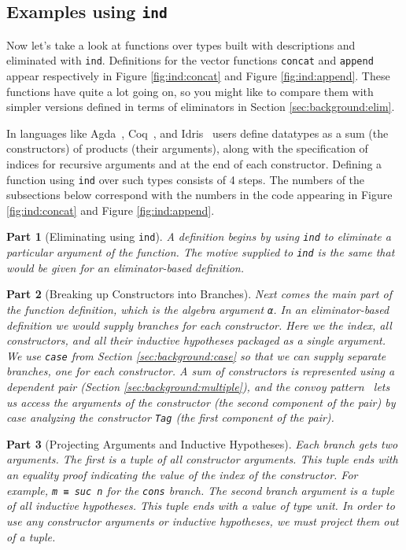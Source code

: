 \documentclass[preprint,nonatbib]{sigplanconf}
\newtheorem{mypart}{Part}
\begin{document}
\subsection{Examples using {\tt ind}}

Now let's take a look at functions over types built with descriptions
and eliminated with {\tt ind}. Definitions for the vector functions
{\tt concat} and {\tt append} appear respectively in
Figure \ref{fig:ind:concat} and Figure \ref{fig:ind:append}. These
functions have quite a lot going on, so you might like to compare them with
simpler versions defined in terms of eliminators in
Section \ref{sec:background:elim}.

In languages like
{\sc Agda}~\citep{norell2007towards},
{\sc Coq}~\citep{coq08}, and
{\sc Idris}~\citep{brady2011idris} users define
datatypes as a sum (the constructors) of products (their arguments),
along with the specification of indices for recursive arguments and at
the end of each constructor. Defining a function using {\tt ind} over
such types consists of 4 steps. The numbers of the subsections below
correspond with the numbers in
the code appearing in Figure \ref{fig:ind:concat} and
Figure \ref{fig:ind:append}.

\begin{mypart}[Eliminating using {\tt ind}]
\label{part:one}
A definition begins by using {\tt ind} to eliminate a particular
argument of the function. The motive supplied to {\tt ind} is the same
that would be given for an eliminator-based definition.
\end{mypart}


\begin{mypart}[Breaking up Constructors into Branches]
\label{part:two}
Next comes the main part of the function definition, which is the
algebra argument {\tt α}. In an eliminator-based definition we would
supply branches for each constructor. Here we the index, all
constructors, and all their inductive hypotheses packaged as a single
argument. We use {\tt case} from Section
\ref{sec:background:case} so that we can supply separate branches, one
for each constructor. A sum of constructors is represented
using a dependent pair (Section
\ref{sec:background:multiple}), and the convoy
pattern~\citep{TODO} lets us access the arguments of the constructor
(the second component of the pair) by case analyzing the
constructor {\tt Tag} (the first component of the pair).
\end{mypart}

\begin{mypart}[Projecting Arguments and Inductive Hypotheses]
\label{part:three}
Each branch gets two arguments. The first is a tuple of all
constructor arguments. This tuple ends with an equality proof
indicating the value of the index of the constructor. For example,
{\tt m ≡ suc n} for the {\tt cons} branch. The second branch argument
is a tuple of all inductive hypotheses. This tuple ends with a value
of type unit. In order to use any constructor arguments or inductive
hypotheses, we must project them out of a tuple.
\end{mypart}
\end{document}
